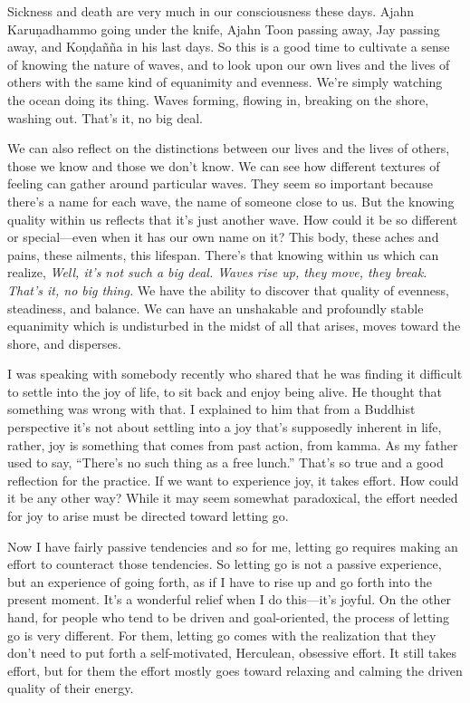 Sickness and death are very much in our consciousness these days. Ajahn 
Karuṇadhammo going under the knife, Ajahn Toon passing away, Jay 
passing away, and Koṇḍañña in his last days. So this is a good 
time to cultivate a sense of knowing the nature of waves, and to look 
upon our own lives and the lives of others with the same kind of 
equanimity and evenness. We're simply watching the ocean doing its 
thing. Waves forming, flowing in, breaking on the shore, washing out. 
That's it, no big deal.

We can also reflect on the distinctions between our lives and the lives 
of others, those we know and those we don't know. We can see how 
different textures of feeling can gather around particular waves. They 
seem so important because there's a name for each wave, the name of 
someone close to us. But the knowing quality within us reflects that 
it's just another wave. How could it be so different or special---even 
when it has our own name on it? This body, these aches and pains, these 
ailments, this lifespan. There's that knowing within us which can 
realize, \emph{Well, it's not such a big deal. Waves rise up, they 
move, they break. That's it, no big thing.} We have the ability to 
discover that quality of evenness, steadiness, and balance. We can have 
an unshakable and profoundly stable equanimity which is undisturbed in 
the midst of all that arises, moves toward the shore, and disperses.


I was speaking with somebody recently who shared that he was finding it 
difficult to settle into the joy of life, to sit back and enjoy being 
alive. He thought that something was wrong with that. I explained to 
him that from a Buddhist perspective it's not about settling into a joy 
that's supposedly inherent in life, rather, joy is something that comes 
from past action, from kamma. As my father used to say, ``There's no 
such thing as a free lunch.'' That's so true and a good reflection for 
the practice. If we want to experience joy, it takes effort. How could 
it be any other way? While it may seem somewhat paradoxical, the effort 
needed for joy to arise must be directed toward letting go.

Now I have fairly passive tendencies and so for me, letting go requires 
making an effort to counteract those tendencies. So letting go is not a 
passive experience, but an experience of going forth, as if I have to 
rise up and go forth into the present moment. It's a wonderful relief 
when I do this---it's joyful. On the other hand, for people who tend to 
be driven and goal-oriented, the process of letting go is very 
different. For them, letting go comes with the realization that they 
don't need to put forth a self-motivated, Herculean, obsessive effort. 
It still takes effort, but for them the effort mostly goes toward 
relaxing and calming the driven quality of their energy.

